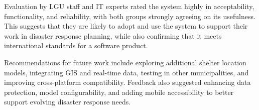 \documentclass[12pt,a4paper,]{article}
\begin{document}
	Evaluation by LGU staff and IT experts rated the system highly in acceptability, functionality, and reliability, with both groups strongly agreeing on its usefulness. This suggests that they are likely to adopt and use the system to support their work in disaster response planning, while also confirming that it meets international standards for a software product.
	
	Recommendations for future work include exploring additional shelter location models, integrating GIS and real-time data, testing in other municipalities, and improving cross-platform compatibility. Feedback also suggested enhancing data protection, model configurability, and adding mobile accessibility to better support evolving disaster response needs.
	
\printbibliography[heading=bibintoc,title={REFERENCES}] %
\end{document}

